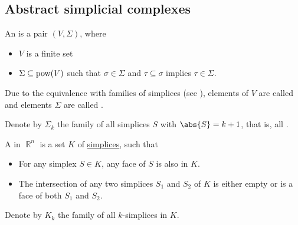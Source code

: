 \subsection{Abstract simplicial complexes}\label{subsec:abstract_simplicial_complexes}

\begin{definition}\label{def:abstract_simplicial_complex}
  An  is a pair \( (V, \Sigma) \), where
  \begin{itemize}
    \item \( V \) is a finite set
    \item \( \Sigma \subseteq \operatorname{pow}(V) \) such that \( \sigma \in \Sigma \) and \( \tau \subseteq \sigma \) implies \( \tau \in \Sigma \).
  \end{itemize}

  Due to the equivalence with families of simplices (see ), elements of \( V \) are called  and elements \( \Sigma \) are called .

  Denote by \( \Sigma_k \) the family of all simplices \( S \) with \( \abs{S} = k + 1 \), that is, all .
\end{definition}

\begin{definition}\label{def:simplicial_complex}
  A  in \( \BbbR^n \) is a set \( K \) of \hyperref[def:simplex]{simplices}, such that
  \begin{itemize}
    \item For any simplex \( S \in K \), any face of \( S \) is also in \( K \).
    \item The intersection of any two simplices \( S_1 \) and \( S_2 \) of \( K \) is either empty or is a face of both \( S_1 \) and \( S_2 \).
  \end{itemize}

  Denote by \( K_k \) the family of all \( k \)-simplices in \( K \).
\end{definition}

